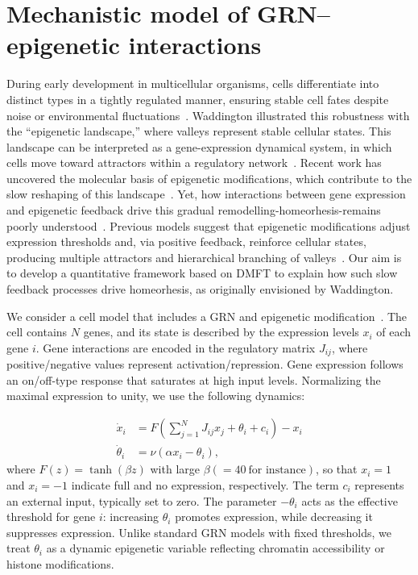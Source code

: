 \documentclass[reprint,amsmath,amssymb,aps]{revtex4-2}
\begin{document}
\section{Mechanistic model of GRN–epigenetic interactions}\label{model}
During early development in multicellular organisms, cells differentiate into distinct types in a tightly regulated manner, ensuring stable cell fates despite noise or environmental fluctuations~\cite{matsushita2022dynamical,kaneko2007evolution,miyamoto2015pluripotency,KanekoPRR2020,Briscoe1,Raju3}. Waddington illustrated this robustness with the “epigenetic landscape,” where valleys represent stable cellular states. This landscape can be interpreted as a gene-expression dynamical system, in which cells move toward attractors within a regulatory network~\cite{matsushita2022dynamical,kaneko2007evolution,miyamoto2015pluripotency,KanekoPRR2020,Waddington,Raju3,Raju2}. Recent work has uncovered the molecular basis of epigenetic modifications, which contribute to the slow reshaping of this landscape~\cite{matsushita2022dynamical,kaneko2007evolution,miyamoto2015pluripotency,KanekoPRR2020}. Yet, how interactions between gene expression and epigenetic feedback drive this gradual remodelling-homeorhesis-remains poorly understood~\cite{matsushita2022dynamical,kaneko2007evolution,miyamoto2015pluripotency,KanekoPRR2020,KanekoScience2012}. Previous models suggest that epigenetic modifications adjust expression thresholds and, via positive feedback, reinforce cellular states, producing multiple attractors and hierarchical branching of valleys~\cite{matsushita2022dynamical,kaneko2007evolution,miyamoto2015pluripotency,KanekoPRR2020}. Our aim is to develop a quantitative framework based on DMFT to explain how such slow feedback processes drive homeorhesis, as originally envisioned by Waddington.

We consider a cell model that includes a GRN and epigenetic modification~\cite{matsushita2022dynamical,kaneko2007evolution,miyamoto2015pluripotency,KanekoPRR2020}. The cell contains $N$ genes, and its state is described by the expression levels $x_i$ of each gene $i$. Gene interactions are encoded in the regulatory matrix $J_{ij}$, where positive/negative values represent activation/repression. Gene expression follows an on/off-type response that saturates at high input levels. Normalizing the maximal expression to unity, we use the following dynamics:

\begin{align}
    \label{eq:ge_x}
    \dot{x}_i&= F\left(\sum_{j=1}^N J_{ij} x_j + \theta_i + c_i\right) - x_i\\
    \label{eq:ge_theta}
    \dot{\theta}_i &= \nu\left(\alpha x_i - \theta_i\right),
\end{align}
where $F(z)=\tanh(\beta z)$ with large $\beta(=40~\text{for instance})$, so that $x_i=1$ and $x_i=-1$ indicate full and no expression, respectively. The term $c_i$ represents an external input, typically set to zero. The parameter $-\theta_i$ acts as the effective threshold for gene $i$: increasing $\theta_i$ promotes expression, while decreasing it suppresses expression. Unlike standard GRN models with fixed thresholds, we treat $\theta_i$ as a dynamic epigenetic variable reflecting chromatin accessibility or histone modifications.
\end{document}
